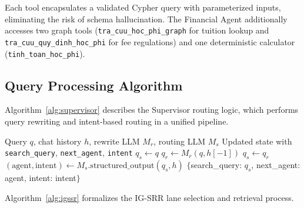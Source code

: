 \documentclass[runningheads]{llncs}
\begin{document}
Each tool encapsulates a validated Cypher query with parameterized inputs, eliminating the risk of schema hallucination. The Financial Agent additionally accesses two graph tools (\texttt{tra\_cuu\_hoc\_phi\_graph} for tuition lookup and \texttt{tra\_cuu\_quy\_dinh\_hoc\_phi} for fee regulations) and one deterministic calculator (\texttt{tinh\_toan\_hoc\_phi}).

\subsection{Query Processing Algorithm}
\label{sec:algorithm}

Algorithm~\ref{alg:supervisor} describes the Supervisor routing logic, which performs query rewriting and intent-based routing in a unified pipeline.

\begin{algorithm}[t]
\caption{Supervisor Node: Query Rewrite and Routing}
\label{alg:supervisor}
\begin{algorithmic}[1]
\Require Query $q$, chat history $h$, rewrite LLM $M_r$, routing LLM $M_s$
\Ensure Updated state with \texttt{search\_query}, \texttt{next\_agent}, \texttt{intent}
\Statex
{}
    \State $q_s \gets q$ 
     
        \State $q_r \gets M_r(q, h[-1])$ 
         
            \State $q_s \gets q_r$
        \EndIf
    \EndIf
    \State $(\text{agent}, \text{intent}) \gets M_s.\text{structured\_output}(q_s, h)$
    \State \Return $\{$search\_query: $q_s$, next\_agent: agent, intent: intent$\}$
\EndFunction
\end{algorithmic}
\end{algorithm}

Algorithm~\ref{alg:igssr} formalizes the IG-SRR lane selection and retrieval process.
\end{document}
